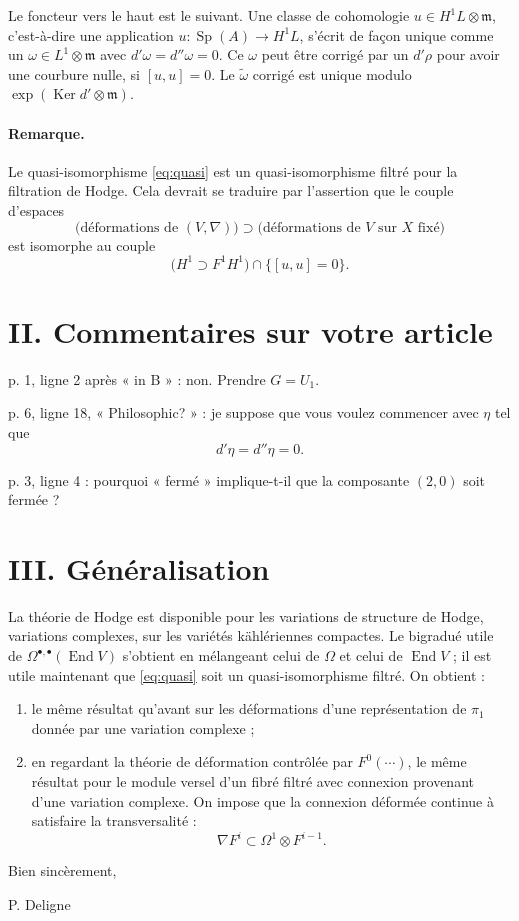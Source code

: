 \documentclass[11pt]{article}
\newcommand{\End}{\operatorname{End}}
\newcommand{\Sp}{\operatorname{Sp}}
\newcommand{\Ker}{\operatorname{Ker}}
\begin{document}
Le foncteur vers le haut est le suivant. Une classe de cohomologie $u\in H^1L\otimes\mathfrak m$, c'est-à-dire une application $u:\Sp(A)\to H^1L$, s'écrit de façon unique comme un $\omega\in L^1\otimes\mathfrak m$ avec $d'\omega=d''\omega=0$. Ce $\omega$ peut être corrigé par un $d'\rho$ pour avoir une courbure nulle, si $[u,u]=0$. Le $\widetilde\omega$ corrigé est unique modulo $\exp(\Ker d'\otimes\mathfrak m)$.

\paragraph{Remarque.}
Le quasi-isomorphisme \eqref{eq:quasi} est un quasi-isomorphisme filtré pour la filtration de Hodge. Cela devrait se traduire par l'assertion que le couple d'espaces
\[
  \bigl(\text{déformations de }(V,\nabla)\bigr)
  \supset
  \bigl(\text{déformations de }V\text{ sur }X\text{ fixé}\bigr)
\]
est isomorphe au couple
\[
  \bigl(H^1\supset F^1H^1\bigr)\cap\{[u,u]=0\}.
\]

\section*{II. Commentaires sur votre article}

p. 1, ligne 2 après « in B » : non. Prendre $G=U_1$.

p. 6, ligne 18, « Philosophic? » : je suppose que vous voulez commencer avec $\eta$ tel que
\[
  d'\eta=d''\eta=0.
\]

p. 3, ligne 4 : pourquoi « fermé » implique-t-il que la composante $(2,0)$ soit fermée ?

\section*{III. Généralisation}

La théorie de Hodge est disponible pour les variations de structure de Hodge, variations complexes, sur les variétés kählériennes compactes. Le bigradué utile de $\Omega^{\bullet,\bullet}(\End V)$ s'obtient en mélangeant celui de $\Omega$ et celui de $\End V$ ; il est utile maintenant que \eqref{eq:quasi} soit un quasi-isomorphisme filtré. On obtient :

\begin{enumerate}[label=\alph*)]
\item le même résultat qu'avant sur les déformations d'une représentation de $\pi_1$ donnée par une variation complexe ;
\item en regardant la théorie de déformation contrôlée par $F^0(\cdots)$, le même résultat pour le module versel d'un fibré filtré avec connexion provenant d'une variation complexe. On impose que la connexion déformée continue à satisfaire la transversalité :
\[
  \nabla F^i\subset \Omega^1\otimes F^{i-1}.
\]
\end{enumerate}

Bien sincèrement,

\begin{flushright}
P. Deligne
\end{flushright}
\end{document}
